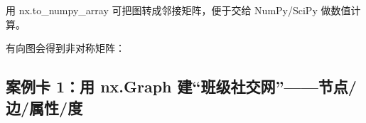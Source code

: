 用 nx.to\_numpy\_array 可把图转成邻接矩阵，便于交给 NumPy/SciPy
做数值计算。

\begin{Shaded}
\begin{Highlighting}[]
\OperatorTok{=}
\NormalTok{G.add\_edges\_from([(}\NormalTok{, }\NormalTok{), (}\NormalTok{, }\NormalTok{), (}\NormalTok{, }\NormalTok{), (}\NormalTok{, }\NormalTok{)])}
\OperatorTok{=}
\end{Highlighting}
\end{Shaded}

\begin{Shaded}
\begin{Highlighting}[]
\NormalTok{[[0. 1. 1. 0.]}
\NormalTok{ [1. 0. 1. 0.]}
\NormalTok{ [1. 1. 0. 1.]}
\NormalTok{ [0. 0. 1. 0.]]}
\end{Highlighting}
\end{Shaded}

有向图会得到非对称矩阵：

\begin{Shaded}
\begin{Highlighting}[]
\OperatorTok{=}\OperatorTok{;}\NormalTok{ D.add\_edges\_from([(}\NormalTok{, }\NormalTok{), (}\NormalTok{, }\NormalTok{), (}\NormalTok{, }\NormalTok{), (}\NormalTok{, }\NormalTok{)])}
\end{Highlighting}
\end{Shaded}

\begin{Shaded}
\begin{Highlighting}[]
\NormalTok{[[0. 1. 0. 0.]}
\NormalTok{ [0. 0. 1. 1.]}
\NormalTok{ [1. 0. 0. 0.]}
\NormalTok{ [0. 0. 0. 0.]]}
\end{Highlighting}
\end{Shaded}

\subsection{案例卡 1：用 nx.Graph
建``班级社交网''------节点/边/属性/度}\label{ux6848ux4f8bux5361-1ux7528-nx.graph-ux5efaux73edux7ea7ux793eux4ea4ux7f51ux8282ux70b9ux8fb9ux5c5eux6027ux5ea6}

